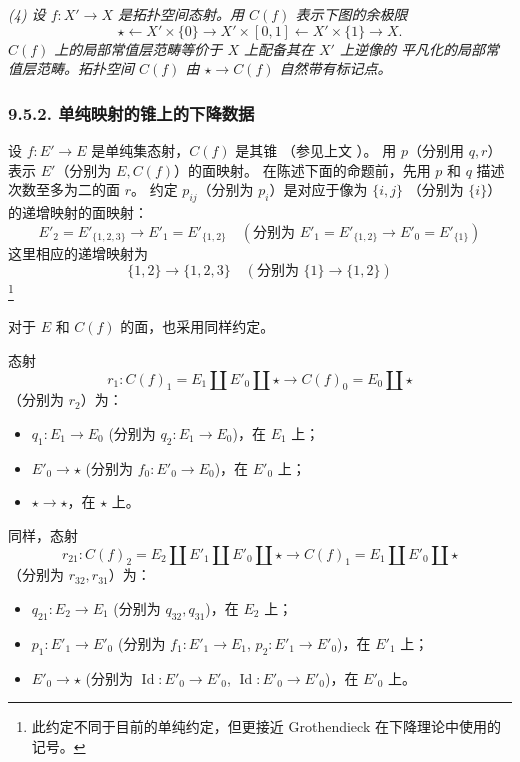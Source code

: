 \emph{(4) 设 \(f:X'\to X\) 是拓扑空间态射。用 \(C(f)\) 表示下图的余极限}
\[
  \star\longleftarrow X'\times\{0\}
  \longrightarrow X'\times[0,1]
  \longleftarrow X'\times\{1\}
  \longrightarrow X.
\]
\emph{\(C(f)\) 上的局部常值层范畴等价于 \(X\) 上配备其在 \(X'\) 上逆像的
平凡化的局部常值层范畴。拓扑空间 \(C(f)\) 由 \(\star\to C(f)\) 自然带有标记点。}

\subsubsection*{9.5.2. 单纯映射的锥上的下降数据}

设 \(f:E'\to E\) 是单纯集态射，\(C(f)\) 是其锥
（参见上文 ）。
用 \(p\)（分别用 \(q,r\)）表示 \(E'\)（分别为 \(E,C(f)\)）的面映射。
在陈述下面的命题前，先用 \(p\) 和 \(q\) 描述次数至多为二的面 \(r\)。
约定 \(p_{ij}\)（分别为 \(p_i\)）是对应于像为 \(\{i,j\}\)
（分别为 \(\{i\}\)）的递增映射的面映射：
\[
  E'_2=E'_{\{1,2,3\}}\longrightarrow
  E'_1=E'_{\{1,2\}}
  \quad
  \left(\text{分别为 }
  E'_1=E'_{\{1,2\}}\longrightarrow E'_0=E'_{\{1\}}\right)
\]
这里相应的递增映射为
\[
  \{1,2\}\longrightarrow\{1,2,3\}
  \quad
  \left(\text{分别为 }
  \{1\}\longrightarrow\{1,2\}\right)
\]
%
\begingroup
\renewcommand{\thefootnote}{2}
\footnote{此约定不同于目前的单纯约定，但更接近 Grothendieck 在下降理论中使用的记号。}
\endgroup
\addtocounter{footnote}{-1}%
对于 \(E\) 和 \(C(f)\) 的面，也采用同样约定。

态射
\[
  r_1:C(f)_1=E_1\amalg E'_0\amalg\star
  \longrightarrow C(f)_0=E_0\amalg\star
\]
（分别为 \(r_2\)）为：
\begin{itemize}
\item \(q_1:E_1\to E_0\) (分别为 \(q_2:E_1\to E_0\))，在 \(E_1\) 上；
\item \(E'_0\to\star\) (分别为 \(f_0:E'_0\to E_0\))，在 \(E'_0\) 上；
\item \(\star\to\star\)，在 \(\star\) 上。
\end{itemize}
同样，态射
\[
  r_{21}:C(f)_2=E_2\amalg E'_1\amalg E'_0\amalg\star
  \longrightarrow C(f)_1=E_1\amalg E'_0\amalg\star
\]
（分别为 \(r_{32},r_{31}\)）为：
\begin{itemize}
\item \(q_{21}:E_2\to E_1\) (分别为 \(q_{32},q_{31}\))，在 \(E_2\) 上；
\item \(p_1:E'_1\to E'_0\) (分别为
  \(f_1:E'_1\to E_1\), \(p_2:E'_1\to E'_0\))，在 \(E'_1\) 上；
\item \(E'_0\to\star\) (分别为
  \(\operatorname{Id}:E'_0\to E'_0\),
  \(\operatorname{Id}:E'_0\to E'_0\))，在 \(E'_0\) 上。
\end{itemize}

